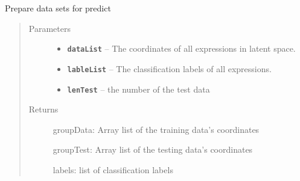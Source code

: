\documentclass[letterpaper,10pt,english]{sphinxmanual}
\begin{document}
\begin{fulllineitems}
\label{Documentation of Code:classify.knn.createDataSet}
Prepare data sets for predict
\begin{quote}\begin{description}
\item[{Parameters}] \leavevmode\begin{itemize}
\item {} 
\textbf{\texttt{dataList}} -- The coordinates of all expressions in latent space.

\item {} 
\textbf{\texttt{lableList}} -- The classification labels of all expressions.

\item {} 
\textbf{\texttt{lenTest}} -- the number of the test data

\end{itemize}

\item[{Returns}] \leavevmode

groupData: Array list of the training data's coordinates

groupTest: Array list of the testing data's coordinates

labels: list of classification labels


\end{description}\end{quote}

\end{fulllineitems}

\end{document}
